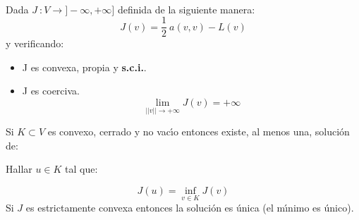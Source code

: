 \begin{teorema} \label{th:exissolopt}
\ \newline

Dada $J\ : V \longrightarrow ] -\infty ,+\infty ]$ definida de la siguiente
manera:
\begin{displaymath}
J(v) = \frac{1}{2} \ a(v,v)-L(v)
\end{displaymath}
y verificando:

\begin{itemize}
\item J es convexa, propia y \textbf{s.c.i.}.
\item J es coerciva.
\begin{equation} \label{eq:deficoerciva}
\lim_{||v|| \to +\infty} J(v) = +\infty
\end{equation}
\end{itemize}
Si $K \subset V$ es convexo, cerrado y no vac\'{\i}o entonces existe, al menos
una, soluci\'on de:\newline

Hallar $u \in K$ tal que:

\begin{displaymath}
J(u) = \inf_{v \in K} J(v)
\end{displaymath}
Si $J$ es estrictamente convexa entonces la soluci\'on es \'unica (el
m\'{\i}nimo es \'unico).

\end{teorema}

